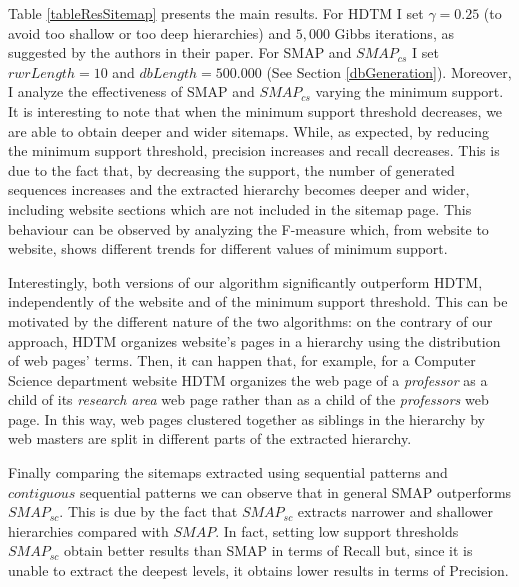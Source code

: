 Table \ref{tableResSitemap} presents the main results. For HDTM  I set $\gamma = 0.25$ (to avoid too shallow or too deep hierarchies) and $5,000$ Gibbs iterations, as suggested by the authors in their paper. For SMAP and $SMAP_{cs}$ I set $rwrLength =10 $ and $dbLength=500.000$ (See Section \ref{dbGeneration}). Moreover, I analyze the effectiveness of SMAP and $SMAP_{cs}$ varying the minimum support. It is interesting to note that when the minimum support threshold decreases, we are able to obtain deeper and wider sitemaps. While, as expected, by reducing the minimum support threshold, precision increases and recall decreases. 
This is due to the fact that, by decreasing the support, the number of generated sequences increases and the extracted hierarchy becomes deeper and wider, including website sections which are not included in the sitemap page. This behaviour can be observed by analyzing the F-measure which, from website to website, shows different trends for different values of minimum support.

Interestingly, both versions of our algorithm significantly outperform HDTM, independently of the website and of the minimum support threshold. 
This can be motivated by the different nature of the two algorithms: on the contrary of our approach, HDTM organizes website's pages in a hierarchy using the distribution of web pages' terms. Then, it can happen that, for example, for a Computer Science department website HDTM organizes the web page of a \emph{professor} as a child of its \emph{research area} web page rather than as a child of the \emph{professors} web page. In this way, web pages clustered together as siblings in the hierarchy by web masters are split in different parts of the extracted hierarchy.

Finally comparing the sitemaps extracted using sequential patterns and $contiguous$ sequential patterns we can observe that in general SMAP outperforms $SMAP_{sc}$. This is due by the fact that $SMAP_{sc}$ extracts narrower and shallower hierarchies compared with $SMAP$. In fact, setting low support thresholds $SMAP_{sc}$ obtain better results than SMAP in terms of Recall but, since it is unable to extract the deepest levels, it obtains lower results in terms of Precision.

